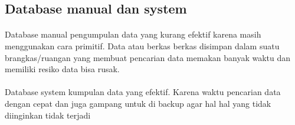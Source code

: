 \documentclass{article}
\begin{document}
\subsection{Database manual dan system }
\paragraph{}Database manual pengumpulan data yang kurang efektif karena masih menggunakan cara primitif. Data atau berkas berkas disimpan dalam suatu brangkas/ruangan yang membuat pencarian data memakan banyak waktu dan memiliki resiko data bisa rusak.

\paragraph{}Database system kumpulan data yang efektif. Karena waktu pencarian data dengan cepat dan juga gampang untuk di backup agar hal hal yang tidak diinginkan tidak terjadi
\end{document}
